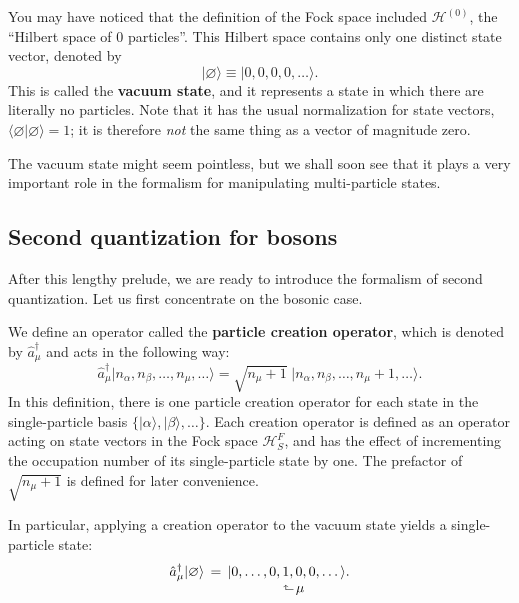 \documentclass[pra,12pt]{revtex4}
\begin{document}
You may have noticed that the definition of the Fock space included
$\mathscr{H}^{(0)}$, the ``Hilbert space of 0 particles''.  This
Hilbert space contains only one distinct state vector, denoted by
$$|\varnothing\rangle \equiv |0,0,0,0,\dots\rangle.$$
This is called the \textbf{vacuum state}, and it represents a state in
which there are literally no particles.  Note that it has the usual
normalization for state vectors,
$\langle\varnothing|\varnothing\rangle = 1$; it is therefore
\textit{not} the same thing as a vector of magnitude zero.

The vacuum state might seem pointless, but we shall soon see that it
plays a very important role in the formalism for manipulating
multi-particle states.

\subsection{Second quantization for bosons}

After this lengthy prelude, we are ready to introduce the formalism of
second quantization.  Let us first concentrate on the bosonic case.  

We define an operator called the \textbf{particle creation operator},
which is denoted by $\hat{a}_\mu^\dagger$ and acts in the following way:
$$\hat{a}_\mu^\dagger \big|n_\alpha, n_\beta, \dots, n_\mu, \dots\big\rangle = \sqrt{n_\mu+1} \; \big|n_\alpha, n_\beta, \dots, n_\mu + 1, \dots\big\rangle. $$
In this definition, there is one particle creation operator for each
state in the single-particle basis
$\{|\alpha\rangle,|\beta\rangle,\dots\}$.  Each creation operator is
defined as an operator acting on state vectors in the Fock space
$\mathscr{H}^F_S$, and has the effect of incrementing the occupation
number of its single-particle state by one.  The prefactor of
$\sqrt{n_\mu+1}$ is defined for later convenience.

In particular, applying a creation operator to the vacuum state yields
a single-particle state:
$$\begin{aligned}\hat{a}_\mu^\dagger |\varnothing\rangle \, &= \, |0,\dots,0, 1, 0, 0, \dots\rangle. \\[-1ex] &\qquad\qquad\quad\;\;\rotatebox[origin=c]{90}{$\Rsh$}\,\mu
\end{aligned}$$
\end{document}

